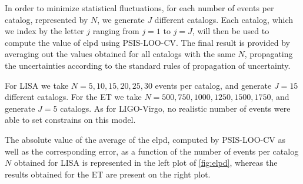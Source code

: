 In order to minimize statistical fluctuations, for each number of events per catalog, represented by $N$, we generate $J$ different catalogs. Each catalog, which we index by the letter $j$ ranging from $j = 1$ to $j = J$, will then be used to compute the value of \gls{elpd} using \gls{PSIS-LOO-CV}. The final result is provided by averaging out the values obtained for all catalogs with the same $N$, propagating the uncertainties according to the standard rules of propagation of uncertainty.

For \gls{LISA} we take $N = 5, 10, 15, 20, 25, 30$ events per catalog, and generate $J = 15$ different catalogs. For the \gls{ET} we take $N = 500, 750, 1000, 1250, 1500, 1750$, and generate $J = 5$ catalogs. As for \gls{LIGO}-Virgo, no realistic number of events were able to set constrains on this model.

The absolute value of the average of the \gls{elpd}, computed by \gls{PSIS-LOO-CV} as well as the corresponding error, as a function of the number of events per catalog $N$ obtained for \gls{LISA} is represented in the left plot of \cref{fig:elpd}, whereas the results obtained for the \gls{ET} are present on the right plot.

